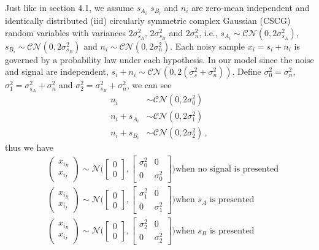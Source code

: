 Just like in section 4.1, 
we assume  $s_{A_i}$ $s_{B_i}$ and $n_i$ are zero-mean independent and identically distributed (iid) circularly symmetric complex Gaussian (CSCG) random variables with variances $2\sigma_{s_A}^2$, $2\sigma_{s_B}^2$ and $2\sigma_{n}^2$, i.e., $s_{A_i} \sim \mathcal{CN}(0, 2\sigma_{s_A}^2)$, $s_{B_i} \sim \mathcal{CN}(0, 2\sigma_{s_B}^2)$ and $n_i \sim \mathcal{CN}(0, 2\sigma_{n}^2)$.
Each noisy sample $x_i = s_i + n_i$ is governed by a probability law under each hypothesis. In our model
since the noise and signal are independent, $s_i+ n_i \sim \mathcal{CN}(0, 2(\sigma_{s}^2 + \sigma_n^2))$.  Define $\sigma_0^2 = \sigma_n^2$, $\sigma_1^2 = \sigma_{s_A}^2 + \sigma_n^2$ and $\sigma_2^2 = \sigma_{s_B}^2 + \sigma_n^2$, we can see
\begin{equation}
  \label{1129a1}
  \begin{split}
  n_i &\sim \mathcal{CN}(0, 2\sigma_0^2)\\
  n_i + s_{A_i} &\sim \mathcal{CN}(0, 2\sigma_1^2)\\
   n_i + s_{B_i}&\sim \mathcal{CN}(0, 2\sigma_2^2) \,,
  \end{split}
\end{equation}
thus we have 
\begin{equation}
   \begin{split}
     &\begin{pmatrix} x_{i_R} \\ x_{i_I} \end{pmatrix} \sim \mathcal{N}\Big( \begin{bmatrix} 0 \\ 0 \end{bmatrix}, \begin{bmatrix} \sigma_0^2 & 0\\ 0 & \sigma_0^2 \end{bmatrix} \Big) \text{when no signal is presented}\\
     &\begin{pmatrix} x_{i_R} \\ x_{i_I} \end{pmatrix} \sim \mathcal{N}\Big( \begin{bmatrix} 0 \\ 0 \end{bmatrix}, \begin{bmatrix} \sigma_1^2 & 0\\ 0 & \sigma_1^2 \end{bmatrix} \Big) \text{when $s_A$ is presented}\\
     &\begin{pmatrix} x_{i_R} \\ x_{i_I} \end{pmatrix} \sim \mathcal{N}\Big( \begin{bmatrix} 0 \\ 0 \end{bmatrix}, \begin{bmatrix} \sigma_2^2 & 0\\ 0 & \sigma_2^2 \end{bmatrix} \Big) \text{when $s_B$ is presented}
\end{split}
  \label{equ:xdistribution2}
\end{equation}
